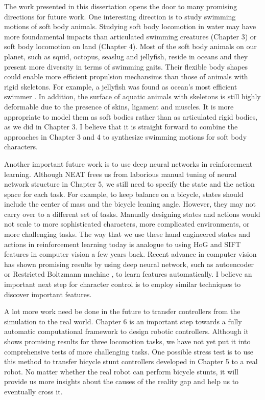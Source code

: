 The work presented in this dissertation opens the door to many promising directions for future work. One interesting direction is to study swimming motions of soft body animals. Studying soft body locomotion in water may have more foundamental impacts than articulated swimming creatures (Chapter 3) or soft body locomotion on land (Chapter 4). Most of the soft body animals on our planet, such as squid, octopus, seaslug and jellyfish, reside in oceans and they present more diversity in terms of swimming gaits. Their flexible body shapes could enable more efficient propulsion mechansims than those of animals with rigid skeletons. For example, a jellyfish was found as ocean's most efficient swimmer \cite{Gemmell:2013}. In addition, the surface of aquatic animals with skeletons is still highly deformable due to the presence of skins, ligament and muscles. It is more appropriate to model them as soft bodies rather than as articulated rigid bodies, as we did in Chapter 3. I believe that it is straight forward to combine the approaches in Chapter 3 and 4 to synthesize swimming motions for soft body characters.

Another important future work is to use deep neural networks in reinforcement learning. Although NEAT frees us from laborious manual tuning of neural network structure in Chapter 5, we still need to specify the state and the action space for each task. For example, to keep balance on a bicycle, states should include the center of mass and the bicycle leaning angle. However, they may not carry over to a different set of tasks. Manually designing states and actions would not scale to more sophisticated characters, more complicated environments, or more challenging tasks. The way that we use these hand engineered states and actions in reinforcement learning today is analogue to using HoG and SIFT features in computer vision a few years back. Recent advance in computer vision has shown promising results by using deep neural network, such as autoencoder \cite{Vincent:2008} or Restricted Boltzmann machine \cite{Hinton:2012}, to learn features automatically. I believe an important next step for character control is to employ similar techniques to discover important features.

A lot more work need be done in the future to transfer controllers from the simulation to the real world. Chapter 6 is an important step towards a fully automatic computational framework to design robotic controllers. Although it shows promising results for three locomotion tasks, we have not yet put it into comprehensive tests of more challenging tasks. One possible stress test is to use this method to transfer bicycle stunt controllers developed in Chapter 5 to a real robot. No matter whether the real robot can perform bicycle stunts, it will provide us more insights about the causes of the reality gap and help us to eventually cross it.


